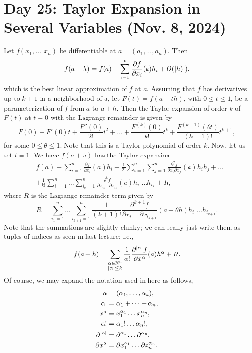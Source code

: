 \section{Day 25: Taylor Expansion in Several Variables (Nov. 8, 2024)}
Let $f(x_1, \dots, x_n)$ be differentiable at $a = (a_1, \dots, a_n)$. Then
\[ f(a + h) = f(a) + \sum_{i=1}^n \frac{\partial f}{\partial x_i}(a) h_i + O(\left\lvert h) \right\rvert), \]
which is the best linear approximation of $f$ at $a$. Assuming that $f$ has derivatives up to $k + 1$ in a neighborhood of $a$, let $F(t) = f(a + th)$, with $0 \leq t \leq 1$, be a parameterization of $f$ from $a$ to $a+h$. Then the Taylor expansion of order $k$ of $F(t)$ at $t = 0$ with the Lagrange remainder is given by
\[ F(0) + F'(0)t + \frac{F''(0)}{2!}t^2 + \dots + \frac{F^{(k)}(0)}{k!} t^k + \frac{F^{(k+1)}(\theta t)}{(k+1)!} t^{k+1}, \]
for some $0 \leq \theta \leq 1$. Note that this is a Taylor polynomial of order $k$. Now, let us set $t = 1$. We have $f(a + h)$ has the Taylor expansion
\begin{align*}
    & f(a) + \sum_{i=1}^n \frac{\partial f}{\partial x_i}(a) h_i + \frac{1}{2!} \sum_{i=1}^n \sum_{j=1}^n \frac{\partial^2 f}{\partial x_i \partial x_j} (a) h_i h_j + \dots \\
    & + \frac{1}{k!} \sum_{i_1 = 1}^n \dots \sum_{i_k = 1}^n \frac{\partial^k f}{\partial x_{i_1} \dots \partial x_{i_k}} (a) h_{i_1} \dots h_{i_k} + R,
\end{align*}
where $R$ is the Lagrange remainder term given by 
\[ R = \sum_{i_1 = 1}^n \dots \sum_{i_{k+1} = 1}^n \frac{1}{(k+1)!} \frac{\partial^{k+1} f}{\partial x_{i_1} \dots \partial x_{i_{k+1}}} (a + \theta h) h_{i_1} \dots h_{i_{k+1}}. \]
Note that the summations are slightly clunky; we can really just write them as tuples of indices as seen in last lecture; i.e.,
\[ f(a + h) = \sum_{\substack{\alpha \in \mathbb N^n \\ \left\lvert \alpha \right\rvert \leq k}} \frac{1}{\alpha!} \frac{\partial^{\left\lvert \alpha \right\rvert} f}{\partial x^\alpha} (a) h^\alpha + R. \]
Of course, we may expand the notation used in here as follows,
\begin{align*}
    \alpha &= (\alpha_1, \dots, \alpha_n), \\
    \left\lvert \alpha \right\rvert &= \alpha_1 + \dots + \alpha_n, \\
    x^\alpha &= x_1^{\alpha_1} \dots x_n^{\alpha_n}, \\
    \alpha! &= \alpha_1! \dots \alpha_n!, \\
    \partial^{\left\lvert \alpha \right\rvert} &= \partial^{\alpha_1} \dots \partial^{\alpha_n}, \\
    \partial x^\alpha &= \partial x_1^{\alpha_1} \dots \partial x_n^{\alpha_n}.
\end{align*}
